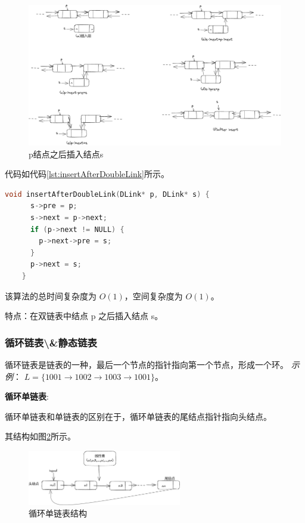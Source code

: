 \documentclass[lang=cn,newtx,10pt,scheme=chinese]{elegantbook}
\begin{document}
  \begin{figure}[h]
    \centering
    \includegraphics[width=1\textwidth]{./figure/pdf/cropped/insertDL.pdf}
    \caption{p结点之后插入结点s}
    \label{fig:insertAfterDoubleLink}
  \end{figure}
  代码如代码\ref{lst:insertAfterDoubleLink}所示。

  \begin{lstlisting}[language=C++, caption={p结点之后插入结点s示例代码}, label={lst:insertAfterDoubleLink}]
    void insertAfterDoubleLink(DLink* p, DLink* s) {
      s->pre = p;
      s->next = p->next;
      if (p->next != NULL) {
        p->next->pre = s;
      }
      p->next = s;
    }
  \end{lstlisting}

  该算法的总时间复杂度为 $O(1)$，空间复杂度为 $O(1)$。

  特点：在双链表中结点 p 之后插入结点 s。



  \subsubsection{循环链表\textbackslash\&静态链表}
  循环链表是链表的一种，最后一个节点的指针指向第一个节点，形成一个环。
  \textit{示例}：
  $L = \{1001 \rightarrow 1002 \rightarrow 1003 \rightarrow 1001\}$。

  \textbf{循环单链表}:

  循环单链表和单链表的区别在于，循环单链表的尾结点指针指向头结点。

  其结构如图\ref{fig:cycleSingleLink}所示。

  \begin{figure}[h]
    \centering
    \includegraphics[width=0.6\textwidth]{./figure/pdf/cropped/cycleSLink.pdf}
    \caption{循环单链表结构}
    \label{fig:cycleSingleLink}
  \end{figure}
\end{document}
